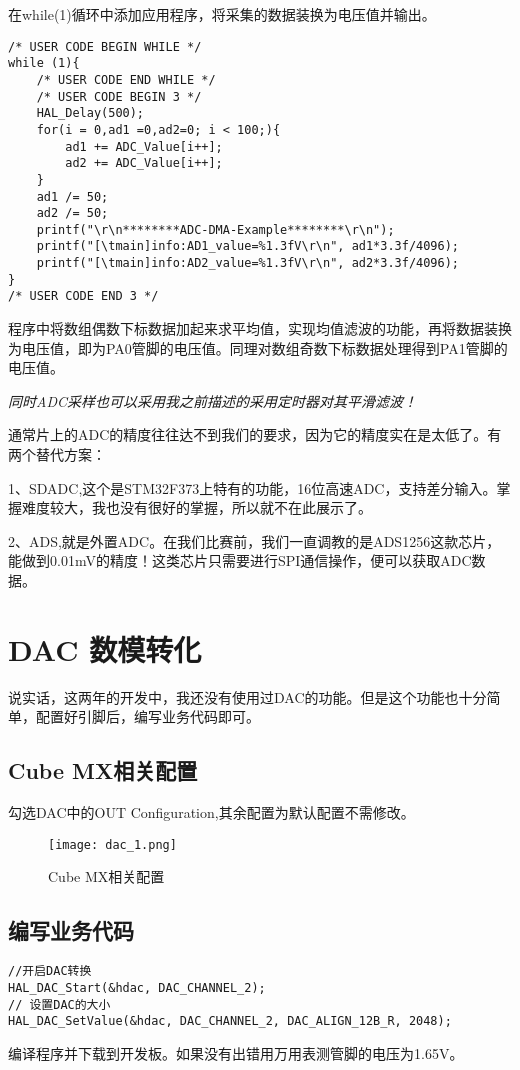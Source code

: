 \documentclass[cn,11pt]{elegantbook}
\begin{document}
在while(1)循环中添加应用程序，将采集的数据装换为电压值并输出。

\begin{lstlisting}
/* USER CODE BEGIN WHILE */
while (1){
	/* USER CODE END WHILE */
	/* USER CODE BEGIN 3 */
	HAL_Delay(500);
	for(i = 0,ad1 =0,ad2=0; i < 100;){
		ad1 += ADC_Value[i++];
		ad2 += ADC_Value[i++];
	}
	ad1 /= 50;
	ad2 /= 50;
	printf("\r\n********ADC-DMA-Example********\r\n");
	printf("[\tmain]info:AD1_value=%1.3fV\r\n", ad1*3.3f/4096);
	printf("[\tmain]info:AD2_value=%1.3fV\r\n", ad2*3.3f/4096);
}
/* USER CODE END 3 */
\end{lstlisting}
程序中将数组偶数下标数据加起来求平均值，实现均值滤波的功能，再将数据装换为电压值，即为PA0管脚的电压值。同理对数组奇数下标数据处理得到PA1管脚的电压值。

\emph{同时ADC采样也可以采用我之前描述的采用定时器对其平滑滤波！}

通常片上的ADC的精度往往达不到我们的要求，因为它的精度实在是太低了。有两个替代方案：

1、SDADC,这个是STM32F373上特有的功能，16位高速ADC，支持差分输入。掌握难度较大，我也没有很好的掌握，所以就不在此展示了。


2、ADS,就是外置ADC。在我们比赛前，我们一直调教的是ADS1256这款芯片，能做到0.01mV的精度！这类芯片只需要进行SPI通信操作，便可以获取ADC数据。


\section{DAC 数模转化}
说实话，这两年的开发中，我还没有使用过DAC的功能。但是这个功能也十分简单，配置好引脚后，编写业务代码即可。
\subsection{Cube MX相关配置}
勾选DAC中的OUT Configuration,其余配置为默认配置不需修改。
\begin{figure}[htbp]
	\centering
	\texttt{[image: dac\_1.png]}
	\caption{Cube MX相关配置 \label{fig:scatter}}
\end{figure}
\newpage
\subsection{编写业务代码}

\lstset{language=C}
\begin{lstlisting}
//开启DAC转换
HAL_DAC_Start(&hdac, DAC_CHANNEL_2);
// 设置DAC的大小
HAL_DAC_SetValue(&hdac, DAC_CHANNEL_2, DAC_ALIGN_12B_R, 2048); 
\end{lstlisting}
编译程序并下载到开发板。如果没有出错用万用表测管脚的电压为1.65V。
\end{document}
